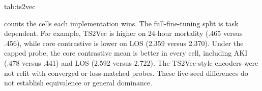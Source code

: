 \begin{table}[htbp]
\floatconts
  {tab:ts2vec}
  {\caption{TS2Vec-style extension versus the core contrastive implementation. Entries count dataset--task cells with the better unrounded mean among 12 cells per protocol.}}
  {}
\end{table}

 counts the cells each implementation wins. The full-fine-tuning split is task dependent. For example, TS2Vec is higher on \MIMIC{} 24-hour mortality (.465 versus .456), while core contrastive is lower on \MIMIC{} LOS (2.359 versus 2.370). Under the capped probe, the core contrastive mean is better in every cell, including \MIMIC{} AKI (.478 versus .441) and LOS (2.592 versus 2.722). The TS2Vec-style encoders were not refit with converged or loss-matched probes. These five-seed differences do not establish equivalence or general dominance.
